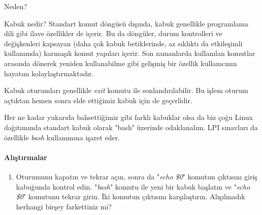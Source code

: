 \begin{section}{Neden?}
\begin{subsection}{Kabuk nedir?}
Standart komut döngüsü dışında, kabuk genellikle programlama dili gibi ilave özellikler de içerir. Bu da döngüler, durum kontrolleri ve değişkenleri kapsayan (daha çok kabuk betiklerinde, az sıklıktı da etkileşimli kullanımda) karmaşık komut yapıları içerir. Son zamanlarda kullanılan komutlar arasında dönerek yeniden kullanabilme gibi gelişmiş bir özellik kullanıcının hayatını kolaylaştırmaktadır.

Kabuk oturumları genellikle \emph{exit} komutu ile sonlandırılabilir. Bu işlem oturum açtıktan hemen sonra elde ettiğimiz kabuk için de geçerlidir.

Her ne kadar yukarıda bahsettiğimiz gibi farklı kabuklar olsa da biz çoğu Linux dağıtımında standart kabuk olarak "bash" üzerinde odaklanalım. LPI sınavları da özellikle \emph{bash} kullanımına işaret eder.
\paragraph{{\Huge{\PencilLeftDown}}Alıştırmalar}{
\pointedenum\begin{enumerate}
 \item Oturumunu kapatın ve tekrar açın, sonra da "\emph{echo \$0}" komutun çıktısını giriş kabuğunda kontrol edin. "\emph{bash}" komutu ile yeni bir kabuk başlatın ve "\emph{echo \$0}" komutunu tekrar girin. İki komutun çıktısını karşılaştırın. Alışılmadık herhangi birşey farkettiniz mi?
\end{enumerate}}
\end{subsection}
\end{section}
